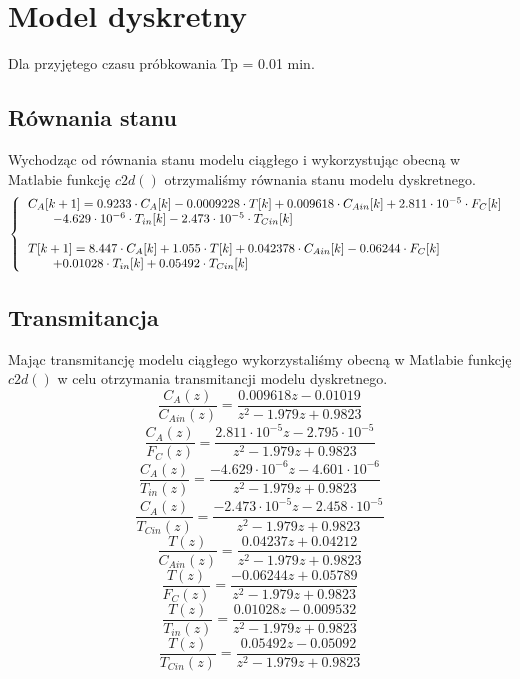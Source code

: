 \chapter{Model dyskretny}
Dla przyjętego czasu próbkowania Tp = 0.01 min.
\section{Równania stanu}
Wychodząc od równania stanu modelu ciągłego i wykorzystując obecną w Matlabie funkcję $c2d()$ otrzymaliśmy równania stanu modelu dyskretnego.
\begin{equation}
	\left\{
	\begin{tabular}{l}
	$C_A[k+1] = 0.9233\cdot C_A[k]  -0.0009228\cdot T[k]+ 0.009618\cdot C_{Ain}[k]+  2.811\cdot 10^{-5}\cdot F_C[k]$\\
	$\quad \quad -4.629\cdot 10^{-6}\cdot T_{in}[k]  -2.473\cdot 10^{-5}\cdot T_{Cin}[k]$\\\\
	$T[k+1] = 8.447\cdot C_A[k] +1.055\cdot T[k]+ 0.042378\cdot C_{Ain}[k]-0.06244\cdot F_C[k]$\\
	$\quad \quad +0.01028\cdot T_{in}[k]  +0.05492\cdot T_{Cin}[k]$\\
	\end{tabular}
	\right.
\end{equation}
\section{Transmitancja}
Mając transmitancję modelu ciągłego wykorzystaliśmy obecną w Matlabie funkcję $c2d()$ w celu otrzymania transmitancji modelu dyskretnego.
\begin{equation}
	\frac{C_A(z)}{C_{Ain}(z)} = \frac{0.009618z-0.01019}{z^2-1.979z+0.9823}
\end{equation}
\begin{equation}
\frac{C_A(z)}{F_C(z)} = \frac{2.811\cdot10^{-5}z-2.795\cdot10^{-5}}{z^2-1.979z+0.9823}
\end{equation}
\begin{equation}
\frac{C_A(z)}{T_{in}(z)} = \frac{-4.629\cdot10^{-6} z - 4.601\cdot10^{-6}}{z^2-1.979z+0.9823}
\end{equation}
\begin{equation}
\frac{C_A(z)}{T_{Cin}(z)} = \frac{-2.473\cdot10^{-5} z - 2.458\cdot 10^{-5}}{z^2-1.979z+0.9823}
\end{equation}
\begin{equation}
\frac{T(z)}{C_{Ain}(z)} = \frac{0.04237 z + 0.04212}{z^2-1.979z+0.9823}
\end{equation}
\begin{equation}
\frac{T(z)}{F_C(z)} = \frac{-0.06244 z + 0.05789}{z^2-1.979z+0.9823}
\end{equation}
\begin{equation}
\frac{T(z)}{T_{in}(z)} = \frac{0.01028 z - 0.009532}{z^2-1.979z+0.9823}
\end{equation}
\begin{equation}
\frac{T(z)}{T_{Cin}(z)} = \frac{0.05492 z - 0.05092}{z^2-1.979z+0.9823}
\end{equation}
\newpage
